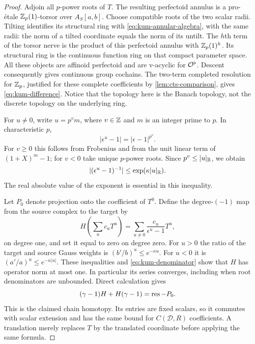 \begin{proof}
Adjoin all $p$-power roots of $T$.  The resulting perfectoid annulus
is a pro-\'etale $\mathbb Z_p(1)$-torsor over $A_S[a,b]$.  Choose compatible
roots of the two scalar radii.  Tilting identifies its structural
ring with \cref{eq:kum-annular-algebra}, with the same radii: the
norm of a tilted coordinate equals the norm of its untilt.  The
$h$th term of the torsor nerve is the product of this perfectoid
annulus with $\mathbb Z_p(1)^h$.  Its structural ring is the continuous
function ring on that compact parameter space.  All these objects
are affinoid perfectoid and are v-acyclic for $\mathcal O^\flat$.
Descent consequently gives continuous group cochains.  The
two-term completed resolution for $\mathbb Z_p$, justified for these
complete coefficients by \cref{lem:cts-comparison}, gives
\cref{eq:kum-difference}.  Notice that the topology here is the
Banach topology, not the discrete topology on the underlying ring.

For $u\ne0$, write $u=p^v m$, where $v\in\mathbb Z$ and $m$ is an integer
prime to $p$.  In characteristic $p$,
\[
 |\epsilon^u-1|=|\epsilon-1|^{p^v}.
\]
For $v\geq0$ this follows from Frobenius and from the unit linear
term of $(1+X)^m-1$; for $v<0$ take unique $p$-power roots.
Since $p^v\leq |u|_{\mathbb R}$, we obtain
\begin{equation}\label{eq:kum-denominator}
 |(\epsilon^u-1)^{-1}|
 \leq \exp(\kappa |u|_{\mathbb R}).
\end{equation}
The real absolute value of the exponent is essential in this
inequality.

Let $P_0$ denote projection onto the coefficient of $T^0$.  Define
the degree-$(-1)$ map from the source complex to the target by
\begin{equation}\label{eq:kum-homotopy}
 H\left(\sum_uc_uT^u\right)
   =\sum_{u\ne0}\frac{c_u}{\epsilon^u-1}T^u,
\end{equation}
on degree one, and set it equal to zero on degree zero.  For $u>0$
the ratio of the target and source Gauss weights is
$(b'/b)^u\leq e^{-\kappa u}$.  For $u<0$ it is
$(a'/a)^u\leq e^{-\kappa|u|}$.  These inequalities and
\cref{eq:kum-denominator} show that $H$ has operator norm at most
one.  In particular its series converges, including when root
denominators are unbounded.  Direct calculation gives
\[
 (\gamma-1)H+H(\gamma-1)=\operatorname{res}-P_0.
\]
This is the claimed chain homotopy.  Its entries are fixed scalars,
so it commutes with scalar extension and has the same bound for
$C(\mathcal D,R)$ coefficients.  A translation merely replaces
$T$ by the translated coordinate before applying the same formula.
\end{proof}

